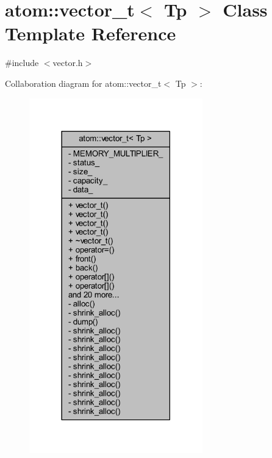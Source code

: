 \hypertarget{classatom_1_1vector__t}{}\section{atom\+:\+:vector\+\_\+t$<$ Tp $>$ Class Template Reference}
\label{classatom_1_1vector__t}


{\ttfamily \#include $<$vector.\+h$>$}



Collaboration diagram for atom\+:\+:vector\+\_\+t$<$ Tp $>$\+:
\nopagebreak
\begin{figure}[H]
\begin{center}
\leavevmode
\includegraphics[width=213pt]{classatom_1_1vector__t__coll__graph}
\end{center}
\end{figure}
